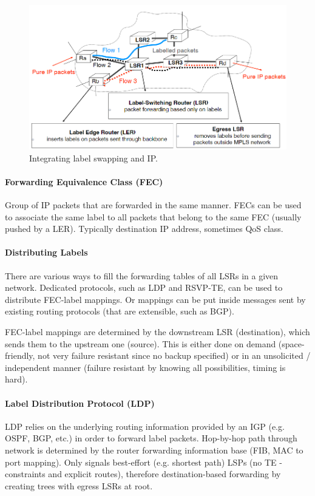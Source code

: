 \begin{figure}[h]
	\centering
	\includegraphics[scale=0.6]{images/1-mpls.PNG}
	\caption{Integrating label swapping and IP.}
	\label{fig:mpls}
\end{figure}


\paragraph{Forwarding Equivalence Class (FEC)}
Group of IP packets that are forwarded in the same manner. FECs can be used to associate the same label to all packets that belong to the same FEC (usually pushed by a LER). Typically destination IP address, sometimes QoS class.

\paragraph{Distributing Labels}
There are various ways to fill the forwarding tables of all LSRs in a given network. Dedicated protocols, such as LDP and RSVP-TE, can be used to distribute FEC-label mappings. Or mappings can be put inside messages sent by existing routing protocols (that are extensible, such as BGP).

FEC-label mappings are determined by the downstream LSR (destination), which sends them to the upstream one (source). This is either done on demand (space-friendly, not very failure resistant since no backup specified) or in an unsolicited / independent manner (failure resistant by knowing all possibilities, timing is hard).

\paragraph{Label Distribution Protocol (LDP)}
LDP relies on the underlying routing information provided by an IGP (e.g. OSPF, BGP, etc.) in order to forward label packets. Hop-by-hop path through network is determined by the router forwarding information base (FIB, MAC to port mapping). Only signals best-effort (e.g. shortest path) LSPs (no TE - constraints and explicit routes), therefore destination-based forwarding by creating trees with egress LSRs at root.

